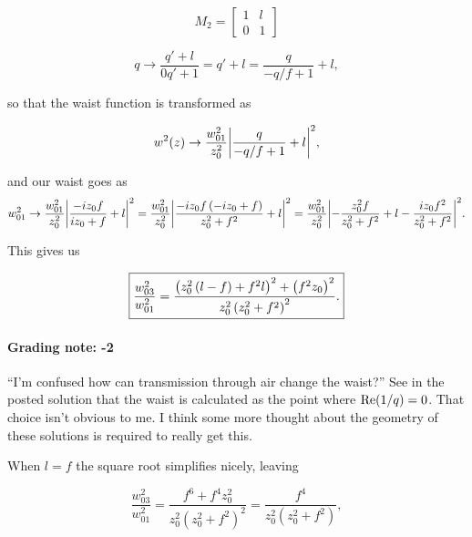 {\begin{dmath}\label{eqn:problemSet4Problem1:160}
M_2 =
\begin{bmatrix}
1 & l \\
0 & 1
\end{bmatrix}
\end{dmath}

\begin{dmath}\label{eqn:problemSet4Problem1:180}
q
\rightarrow \frac{q' + l}{0 q' + 1}
= q' + l
= \frac{q}{-q/f + 1} + l,
\end{dmath}

so that the waist function is transformed as

\begin{dmath}\label{eqn:problemSet4Problem1:200}
w^2(z) \rightarrow \frac{w_{01}^2}{z_0^2} \Abs{
\frac{q}{-q/f + 1} + l
}^2,
\end{dmath}

and our waist goes as
\begin{dmath}\label{eqn:problemSet4Problem1:220}
w_{01}^2
\rightarrow \frac{w_{01}^2}{z_0^2} \Abs{
\frac{-i z_0 f }{i z_0 + f} + l
}^2
= \frac{w_{01}^2}{z_0^2} \Abs{
\frac{-i z_0 f \left(-i z_0 + f\right)}{z_0^2 + f^2} + l
}^2
= \frac{w_{01}^2}{z_0^2} \Abs{
-\frac{z_0^2 f}{z_0^2 + f^2} + l
-\frac{i z_0 f^2 }{z_0^2 + f^2}
}^2.
\end{dmath}

This gives us

\begin{dmath}\label{eqn:problemSet4Problem1:240}
\myBoxed{
\frac{w_{03}^2}{w_{01}^2}
= \frac{
\left(z_0^2 \left(l - f\right) + f^2 l\right)^2
+ \left( f^2 z_0  \right)^2
}{z_0^2 \left(z_0^2 + f^2\right)^2 }.
}
\end{dmath}

\paragraph{Grading note: -2} ``I'm confused how can transmission through air change the waist?''  See in the posted solution that the waist is calculated as the point where $\operatorname{Re}(1/q) = 0$.  That choice isn't obvious to me.  I think some more thought about the geometry of these solutions is required to really get this.

When $l = f$ the square root simplifies nicely, leaving

\begin{dmath}\label{eqn:problemSet4Problem1:260}
\frac{w_{03}^2}{w_{01}^2}
= \frac{
f^6 + f^4 z_0^2
}{z_0^2 \left(z_0^2 + f^2\right)^2 }
=
\frac{f^4}{z_0^2\left(z_0^2 + f^2\right) },
\end{dmath}

}
